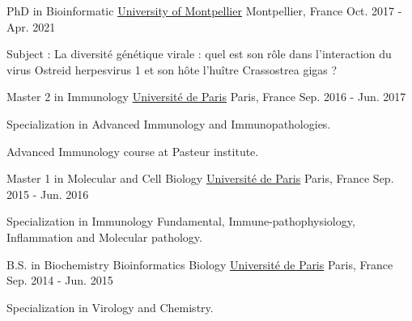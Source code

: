 

\begin{cventries}

  \cventry
    {PhD in Bioinformatic} %
    {\href{https://www.umontpellier.fr/en/}{University of Montpellier}} %
    {Montpellier, France} %
    {Oct. 2017 - Apr. 2021} %
    {
      \begin{cvitems} %
        \item {Subject : La diversité génétique virale : quel est son rôle dans l'interaction du virus Ostreid herpesvirus 1 et son hôte l’huître Crassostrea gigas ?}
      \end{cvitems}
    }

  \cventry
    {Master 2 in Immunology} %
    {\href{https://u-paris.fr/en/universite-de-paris/}{Université de Paris}} %
    {Paris, France} %
    {Sep. 2016 - Jun. 2017} %
    {
      \begin{cvitems} %
        \item {Specialization in Advanced Immunology and Immunopathologies.}
        \item {Advanced Immunology course at Pasteur institute.}
      \end{cvitems}
    }

  \cventry
    {Master 1 in  Molecular and Cell Biology} %
    {\href{https://u-paris.fr/en/universite-de-paris/}{Université de Paris}} %
    {Paris, France} %
    {Sep. 2015 - Jun. 2016} %
    {
      \begin{cvitems} %
        \item {Specialization in Immunology Fundamental, Immune-pathophysiology, Inflammation and Molecular pathology.}
      \end{cvitems}
    }

  \cventry
    {B.S. in Biochemistry Bioinformatics Biology} %
    {\href{https://u-paris.fr/en/universite-de-paris/}{Université de Paris}} %
    {Paris, France} %
    {Sep. 2014 - Jun. 2015} %
    {
      \begin{cvitems} %
        \item {Specialization in Virology and Chemistry.}
      \end{cvitems}
    }
    

\end{cventries}

